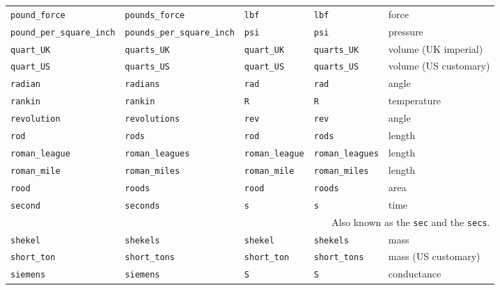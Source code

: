 \begin{landscape}
\begin{center}
\begin{longtable}{|lllll|}
{\tt\footnotesize pound\_force} & {\tt\footnotesize pounds\_force} & {\tt\footnotesize lbf} & {\tt\footnotesize lbf} & force \\
{\tt\footnotesize pound\_per\_square\_inch} & {\tt\footnotesize pounds\_per\_square\_inch} & {\tt\footnotesize psi} & {\tt\footnotesize psi} & pressure \\
{\tt\footnotesize quart\_UK} & {\tt\footnotesize quarts\_UK} & {\tt\footnotesize quart\_UK} & {\tt\footnotesize quarts\_UK} & volume (UK imperial) \\
{\tt\footnotesize quart\_US} & {\tt\footnotesize quarts\_US} & {\tt\footnotesize quart\_US} & {\tt\footnotesize quarts\_US} & volume (US customary) \\
{\tt\footnotesize radian} & {\tt\footnotesize radians} & {\tt\footnotesize rad} & {\tt\footnotesize rad} & angle \\
{\tt\footnotesize rankin} & {\tt\footnotesize rankin} & {\tt\footnotesize R} & {\tt\footnotesize R} & temperature \\
{\tt\footnotesize revolution} & {\tt\footnotesize revolutions} & {\tt\footnotesize rev} & {\tt\footnotesize rev} & angle \\
{\tt\footnotesize rod} & {\tt\footnotesize rods} & {\tt\footnotesize rod} & {\tt\footnotesize rods} & length \\
{\tt\footnotesize roman\_league} & {\tt\footnotesize roman\_leagues} & {\tt\footnotesize roman\_league} & {\tt\footnotesize roman\_leagues} & length \\
{\tt\footnotesize roman\_mile} & {\tt\footnotesize roman\_miles} & {\tt\footnotesize roman\_mile} & {\tt\footnotesize roman\_miles} & length \\
{\tt\footnotesize rood} & {\tt\footnotesize roods} & {\tt\footnotesize rood} & {\tt\footnotesize roods} & area \\
{\tt\footnotesize second} & {\tt\footnotesize seconds} & {\tt\footnotesize s} & {\tt\footnotesize s} & time \\
\multicolumn{5}{|r|}{\footnotesize Also known as the {\tt sec} and the {\tt secs}.} \\
{\tt\footnotesize shekel} & {\tt\footnotesize shekels} & {\tt\footnotesize shekel} & {\tt\footnotesize shekels} & mass \\
{\tt\footnotesize short\_ton} & {\tt\footnotesize short\_tons} & {\tt\footnotesize short\_ton} & {\tt\footnotesize short\_tons} & mass (US customary) \\
{\tt\footnotesize siemens} & {\tt\footnotesize siemens} & {\tt\footnotesize S} & {\tt\footnotesize S} & conductance \\

\end{longtable}
\end{center}
\end{landscape}
